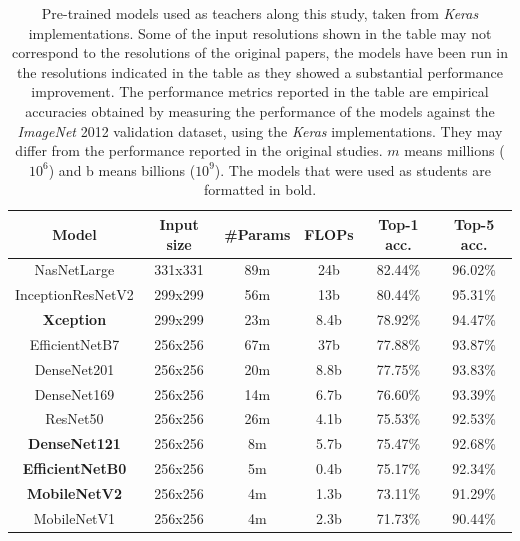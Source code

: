  \begin{table}[h]
	 \small
	 \caption[List of pre-trained models used in the experiments]{Pre-trained models used as teachers along this study, taken from \textit{Keras} implementations. Some of the input resolutions shown in the table may not correspond to the resolutions of the original papers, the models have been run in the resolutions indicated in the table as they showed a substantial performance improvement. The performance metrics reported in the table are empirical accuracies obtained by measuring the performance of the models against the \textit{ImageNet} 2012 validation dataset, using the \textit{Keras} implementations. They may differ from the performance reported in the original studies. $m$ means millions ($10^6$) and b means billions ($10^9$). The models that were used as students are formatted in bold.}
	 \centering
 \begin{tabular}{c|ccc|cc}
	 \toprule
			  Model          & Input size & \#Params &  FLOPs  & Top-1 acc. & Top-5 acc. \\ \midrule
		   NasNetLarge       &  331x331   &   89m    &  24b & 82.44\%  &  96.02\%    \\
		InceptionResNetV2    &  299x299   &   56m    & 13b & 80.44\%  &  95.31\%     \\
		\textbf{Xception}    &  299x299   &   23m    &  8.4b & 78.92\%  &  94.47\%     \\
		 EfficientNetB7      &  256x256   &   67m    &  37b & 77.88\%  &  93.87\%     \\
		   DenseNet201       &  256x256   &   20m    &  8.8b & 77.75\%  &  93.83\%     \\
		   DenseNet169       &  256x256   &   14m    & 6.7b & 76.60\%  &  93.39\%     \\
			ResNet50         &  256x256   &   26m    & 4.1b  & 75.53\%  &  92.53\%     \\
	  \textbf{DenseNet121}   &  256x256   &    8m    &  5.7b & 75.47\%  &  92.68\%     \\
	 \textbf{EfficientNetB0} &  256x256   &    5m    & 0.4b & 75.17\%  &  92.34\%     \\
	  \textbf{MobileNetV2}   &  256x256   &    4m    &  1.3b & 73.11\%  &  91.29\%     \\
		   MobileNetV1       &  256x256   &    4m    & 2.3b & 71.73\%  &  90.44\%     \\ \bottomrule
 \end{tabular}
 \label{table:models}
 \end{table}

